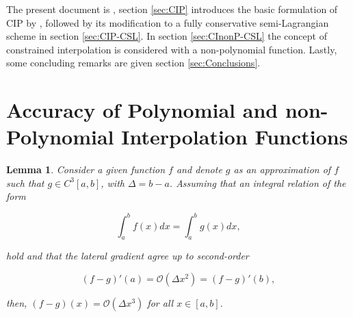 \documentclass[10pt,a4paper]{article}
\newtheorem{lemma}{Lemma}
\begin{document}
The present document is , section \ref{sec:CIP} introduces the basic formulation of CIP by \cite{Yabe1991}, followed by its modification to a fully conservative semi-Lagrangian scheme in section \ref{sec:CIP-CSL}. In section \ref{sec:CInonP-CSL} the concept of constrained interpolation is considered with a non-polynomial function. Lastly, some concluding remarks are given section \ref{sec:Conclusions}.

\section{Accuracy of Polynomial and non-Polynomial Interpolation Functions}

\begin{lemma} 
Consider a given function $f$ and denote $g$ as an approximation of $f$ such that $g\in C^3[a,b]$, with $\Delta=b-a$. Assuming that an integral relation of the form
%
\begin{linenomath}
\begin{equation}
	\int_{a}^{b} f(x)dx = \int_{a}^{b} g(x)dx,
\end{equation}
\end{linenomath}
%
hold and that the lateral gradient agree up to second-order
%
\begin{linenomath}
\begin{equation}
	(f-g)'(a) = \mathcal{O}(\Delta x^2) = (f-g)'(b),
	\label{eq:lateralgradientsAssumption}
\end{equation}
\end{linenomath}
%
then, $(f-g)(x) = \mathcal{O}(\Delta x^3)$ for all $x\in[a,b]$.
\end{lemma}
\end{document}
